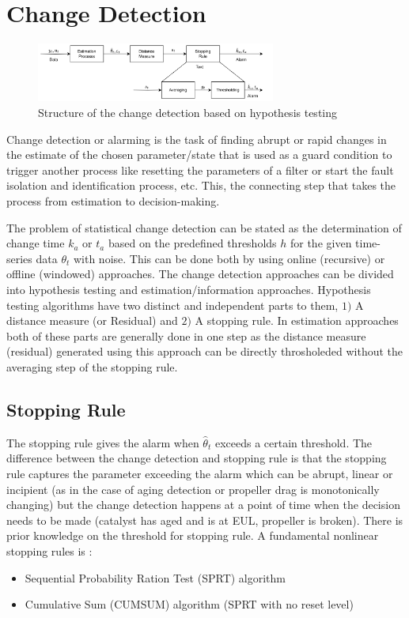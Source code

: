 \section{Change Detection}

\begin{figure}[H]
        \centering
        \includegraphics[width = 0.7\textwidth]{./Part1/figs/change_flow.png}
        \caption{Structure of the change detection based on hypothesis testing}
\end{figure}

Change detection or alarming is the task of finding abrupt or rapid changes in the estimate of the chosen parameter/state that is used as a guard condition to trigger another process like resetting the parameters of a filter or start the fault isolation and identification process, etc. This, the connecting step that takes the process from estimation to decision-making.

The problem of statistical change detection can be stated as the determination of change time $k_a$ or $t_a$ based on the predefined thresholds $h$ for the given time-series data $\theta_t$ with noise. This can be done both by using online (recursive) or offline (windowed) approaches. The change detection approaches can be divided into hypothesis testing and estimation/information approaches. Hypothesis testing algorithms have two distinct and independent parts to them, $1)$ A distance measure (or Residual) and $2)$ A stopping rule. In estimation approaches both of these parts are generally done in one step as the distance measure (residual) generated using this approach can be directly throsholeded without the averaging step of the stopping rule.

\subsection{Stopping Rule}

The stopping rule gives the alarm when $\hat \theta_t$ exceeds a certain threshold. The difference between the change detection and stopping rule is that the stopping rule captures the parameter exceeding the alarm which can be abrupt, linear or incipient (as in the case of aging detection or propeller drag is monotonically changing) but the change detection happens at a point of time when the decision needs to be made (catalyst has aged and is at EUL, propeller is broken). There is prior knowledge on the threshold for stopping rule. A fundamental nonlinear stopping rules is \cite{malladi1999generalized}:
\begin{itemize}
        \item Sequential Probability Ration Test (SPRT) algorithm
        \item Cumulative Sum (CUMSUM) algorithm (SPRT with no reset level)
\end{itemize}

